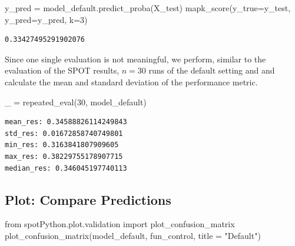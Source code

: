 \documentclass[
  letterpaper,
  DIV=11,
  numbers=noendperiod]{scrreprt}
\newenvironment{Shaded}{\begin{snugshade}}{\end{snugshade}}
\newcommand{\DecValTok}[1]{\textcolor[rgb]{0.68,0.00,0.00}{#1}}
\newcommand{\ImportTok}[1]{\textcolor[rgb]{0.00,0.46,0.62}{#1}}
\newcommand{\NormalTok}[1]{\textcolor[rgb]{0.00,0.23,0.31}{#1}}
\newcommand{\OperatorTok}[1]{\textcolor[rgb]{0.37,0.37,0.37}{#1}}
\newcommand{\StringTok}[1]{\textcolor[rgb]{0.13,0.47,0.30}{#1}}
\begin{document}
\begin{Shaded}
\begin{Highlighting}[]
\NormalTok{y\_pred }\OperatorTok{=}\NormalTok{ model\_default.predict\_proba(X\_test)}
\NormalTok{mapk\_score(y\_true}\OperatorTok{=}\NormalTok{y\_test, y\_pred}\OperatorTok{=}\NormalTok{y\_pred, k}\OperatorTok{=}\DecValTok{3}\NormalTok{)}
\end{Highlighting}
\end{Shaded}

\begin{verbatim}
0.33427495291902076
\end{verbatim}

Since one single evaluation is not meaningful, we perform, similar to
the evaluation of the SPOT results, \(n=30\) runs of the default setting
and and calculate the mean and standard deviation of the performance
metric.

\begin{Shaded}
\begin{Highlighting}[]
\NormalTok{\_ }\OperatorTok{=}\NormalTok{ repeated\_eval(}\DecValTok{30}\NormalTok{, model\_default)}
\end{Highlighting}
\end{Shaded}

\begin{verbatim}
mean_res: 0.34588826114249843
std_res: 0.01672858740749801
min_res: 0.3163841807909605
max_res: 0.38229755178907715
median_res: 0.346045197740113
\end{verbatim}

\hypertarget{plot-compare-predictions-2}{%
\subsection{Plot: Compare
Predictions}\label{plot-compare-predictions-2}}

\begin{Shaded}
\begin{Highlighting}[]
\ImportTok{from}\NormalTok{ spotPython.plot.validation }\ImportTok{import}\NormalTok{ plot\_confusion\_matrix}
\NormalTok{plot\_confusion\_matrix(model\_default, fun\_control, title }\OperatorTok{=} \StringTok{"Default"}\NormalTok{)}
\end{Highlighting}
\end{Shaded}
\end{document}
